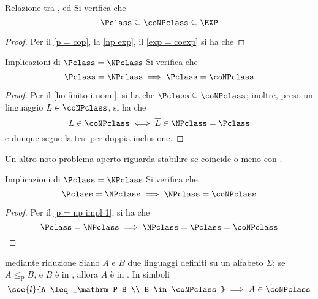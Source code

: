 \documentclass[a4paper, 12pt]{report}
\begin{document}
    \begin{framedprop}[label={ho finito i nomi}]{Relazione tra \Pclass, \coNPclass ed \EXP}
        Si verifica che $$\Pclass \subseteq \coNPclass \subseteq \EXP$$
    \end{framedprop}

    \begin{proof}
        Per il \cref{p = cop}, la \cref{np exp}, il \cref{exp = coexp} si ha che 
    \end{proof}

    \begin{framedthm}[label={p = np impl 1}]{Implicazioni di $\Pclass = \NPclass$}
        Si verifica che $$\Pclass = \NPclass \implies \Pclass = \coNPclass$$
    \end{framedthm}

    \begin{proof}
        Per il \cref{ho finito i nomi}, si ha che $\Pclass \subseteq \coNPclass$; inoltre, preso un linguaggio $L \in \coNPclass$, si ha che $$L \in \coNPclass \iff \overline L \in \NPclass = \Pclass$$ e dunque segue la tesi per doppia inclusione.
    \end{proof}

    \begin{framedobs}{}
        Un altro noto problema aperto riguarda stabilire se \href{https://en.wikipedia.org/wiki/Co-NP}{\NPclass coincide o meno con \coNPclass}.
    \end{framedobs}

    \begin{framedcor}[label={p = np impl 2}]{Implicazioni di $\Pclass = \NPclass$}
        Si verifica che $$\Pclass = \NPclass \implies \NPclass = \coNPclass$$
    \end{framedcor}

    \begin{proof}
        Per il \cref{p = np impl 1}, si ha che $$\Pclass = \NPclass \implies \NPclass = \Pclass = \coNPclass$$
    \end{proof}

    \begin{framedthm}[label={conp w red}]{\coNPclass mediante riduzione}
        Siano $A$ e $B$ due linguaggi definiti su un alfabeto $\Sigma$; se $A \leq_\mathrm P B$, e $B$ è in \coNPclass, allora $A$ è in \coNPclass. In simboli $$\soe{l}{A \leq_\mathrm P B \\ B \in \coNPclass} \implies A \in \coNPclass$$
    \end{framedthm}
\end{document}
